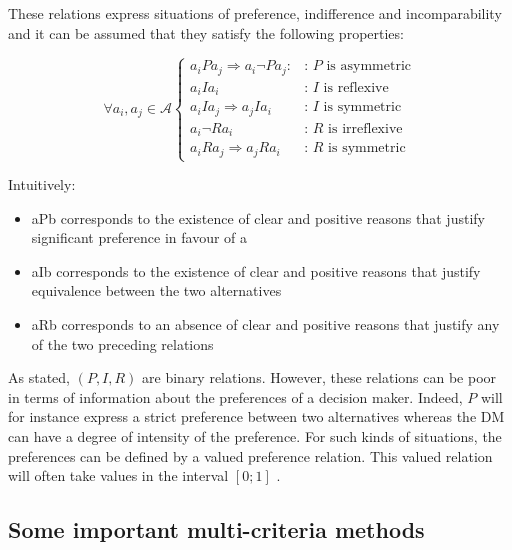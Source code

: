 These relations express situations of preference, indifference and incomparability and it can be assumed that they satisfy the following properties:

\begin{equation}
\forall a_i, a_j \in \mathcal{A} \left\{
	\begin{array}{ll}
	a_iPa_j \Rightarrow a_i \neg P a_j : & \text{: $P$ is asymmetric}\\
	a_iIa_i & \text{: $I$ is reflexive}\\
	a_iIa_j \Rightarrow a_jIa_i & \text{: $I$ is symmetric}\\
	a_i \neg R a_i & \text{: $R$ is irreflexive}\\
	a_iRa_j \Rightarrow a_jRa_i & \text{: $R$ is symmetric}
	\end{array}
\right.
\end{equation}

Intuitively:
\begin{itemize}
\item aPb corresponds to the existence of clear and positive reasons that justify significant preference in favour of a
\item aIb corresponds to the existence of clear and positive reasons that justify equivalence between the two alternatives
\item aRb corresponds to an absence of clear and positive reasons that justify any of the two preceding relations
\end{itemize}

As stated, $(P,I,R)$ are binary relations. However, these relations can be poor in terms of information about the preferences of a decision maker. Indeed, $P$ will for instance express a strict preference between two alternatives whereas the DM can have a degree of intensity of the preference. For such kinds of situations, the preferences can be defined by a valued preference relation. This valued relation will often take values in the interval $[0; 1]$ \cite{EhrgottFigueiraGreco2005}.

\subsection{Some important multi-criteria methods}
\label{subsec:mcdamethods}

